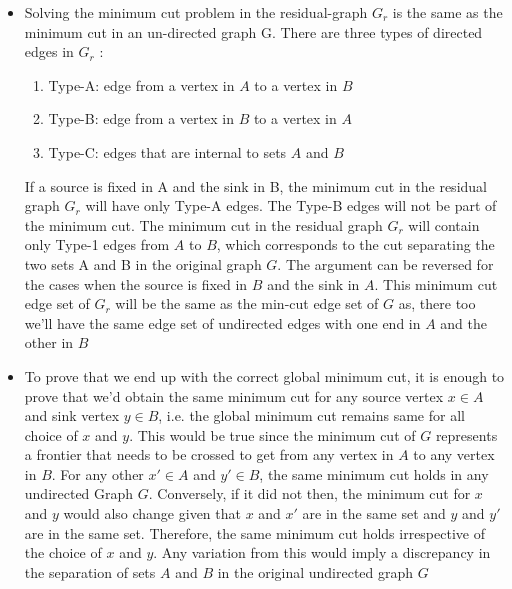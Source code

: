 \documentclass{article}
\begin{document}
    \begin{itemize}
        \item Solving the minimum cut problem in the residual-graph $G_r$ is the same
as the minimum cut in an un-directed graph G. There are three types of directed edges in $G_r$ :
    \begin{enumerate}
        \item Type-A: edge from a vertex in $A$ to a vertex in $B$
        \item Type-B: edge from a vertex in $B$ to a vertex in $A$
        \item Type-C: edges that are internal to sets $A$ and $B$
    \end{enumerate}
    If a source is fixed in A and the sink in B, the minimum cut in the
    residual graph $G_r$ will have only Type-A edges. The Type-B edges will
    not be part of the minimum cut. The minimum cut in the residual
    graph $G_r$ will contain only Type-1 edges from $A$ to $B$, which corresponds to the cut separating the two sets A and B in the original graph
    $G$. The argument can be reversed for the cases when the source is fixed
    in $B$ and the sink in $A$. This minimum cut edge set of $G_r$ will be the
    same as the min-cut edge set of $G$ as, there too we’ll have the same
    edge set of undirected edges with one end in $A$ and the other in $B$
    
    \item To prove that we end up with the correct global minimum cut, it is enough to prove that we’d obtain the same minimum cut for any source vertex $x \in A$ and sink vertex $y \in B$, i.e. the global minimum cut remains same for all choice of $x$ and $y$. This would be true since the minimum cut of $G$ represents a frontier that needs to be crossed to get from any vertex in $A$ to any vertex in $B$. For any other $x' \in A$ and $y' \in B$, the same minimum cut holds in any undirected Graph $G$. Conversely, if it did not then, the minimum cut for $x$ and $y$ would also change given that $x$ and $x'$ are in the same set and $y$ and $y'$ are in the same set. Therefore, the same minimum cut holds irrespective of the choice of $x$ and $y$. Any variation from this would imply a discrepancy in the separation of sets $A$ and $B$ in the original undirected graph $G$
    \end{itemize}
\end{document}
